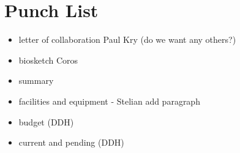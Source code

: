 \section{Punch List}

\begin{itemize}

\item letter of collaboration Paul Kry (do we want any others?)
\item biosketch Coros
\item summary
\item facilities and equipment - Stelian add paragraph
\item budget (DDH)
\item current and pending (DDH)

\end{itemize}
